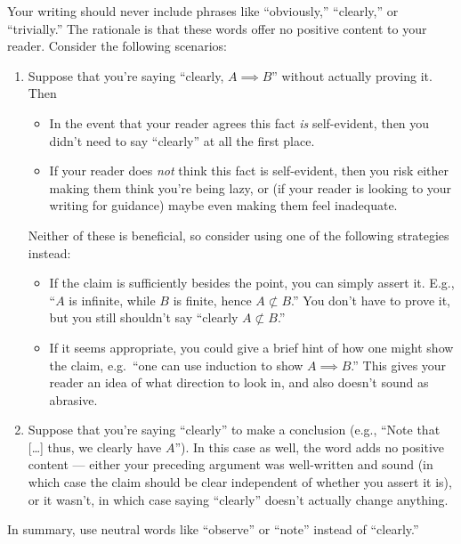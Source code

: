 \documentclass{fkpset}
\begin{document}
\begin{problem}[A4]
  Your writing should never include phrases like ``obviously,'' ``clearly,'' or
  ``trivially.'' The rationale is that these words offer no positive content to
  your reader. Consider the following scenarios:
  \begin{enumerate}[label=(\arabic*)]
    \item Suppose that you're saying ``clearly, $A \implies B$'' without
      actually proving it. Then
      \begin{itemize}
        \item In the event that your reader agrees this fact \emph{is}
          self-evident, then you didn't need to say ``clearly'' at all the first
          place.
        \item If your reader does \emph{not} think this fact is self-evident,
          then you risk either making them think you're being lazy, or (if your
          reader is looking to your writing for guidance) maybe even making them
          feel inadequate.
      \end{itemize}
      Neither of these is beneficial, so consider using one of the following
      strategies instead:
      \begin{itemize}
        \item If the claim is sufficiently besides the point, you can simply
          assert it. E.g., ``$A$ is infinite, while $B$ is finite, hence $A \not
          \subset B$.'' You don't have to prove it, but you still shouldn't say
          ``clearly $A \not \subset B$.''
        \item If it seems appropriate, you could give a brief hint of how one
          might show the claim, e.g.\ ``one can use induction to show $A
          \implies B$.'' This gives your reader an idea of what direction to
          look in, and also doesn't sound as abrasive.
        \end{itemize}
    \item Suppose that you're saying ``clearly'' to make a conclusion (e.g.,
      ``Note that [\ldots] thus, we clearly have $A$''). In this case as well,
      the word adds no positive content --- either your preceding argument
      was well-written and sound (in which case the claim should be clear
      independent of whether you assert it is), or it wasn't, in which case
      saying ``clearly'' doesn't actually change anything.
  \end{enumerate}
  In summary, use neutral words like ``observe'' or ``note'' instead of
  ``clearly.''
\end{problem}
\end{document}
